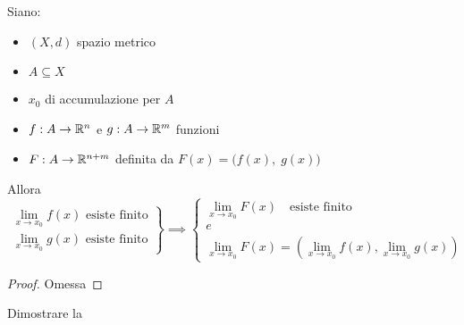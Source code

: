 \begin{proposition}
	\label{prop:lim_in_R_coord_F}
	Siano:
	\begin{itemize}[noitemsep]
		\item $(X,d)$ spazio metrico
		\item $A \subseteq X$
		\item $x_0$ di accumulazione per $A$
		\item $f: A \to \mathbb{R}^n$ e $g: A \to \mathbb{R}^m$ funzioni
		\item $F: A \to \mathbb{R}^{n+m}$ definita da $F(x) = \bigl( f(x),\; g(x) \bigr)$
	\end{itemize}
	Allora
	\begin{equation*}
		\left.
		\begin{array}{r}
			\lim\limits_{x \to x_0} f(x) \text{ esiste finito}\\
			\lim\limits_{x \to x_0} g(x) \text{ esiste finito}
		\end{array}
		\right\}
		\implies
		\left\{
		\begin{array}{c}
			\lim\limits_{x \to x_0} F(x) \quad \text{esiste finito}\\
			e\\
			\lim\limits_{x \to x_0} F(x) = \left( \lim\limits_{x \to x_0} f(x), \lim\limits_{x \to x_0} g(x) \right)
		\end{array}
		\right.
	\end{equation*}
	\begin{proof}
		Omessa
	\end{proof}
\end{proposition}
\begin{exercise}
	Dimostrare la 
\end{exercise}
